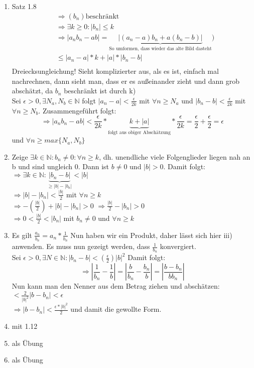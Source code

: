 \documentclass[12pt]{article}
\begin{document}
\begin{enumerate}[\bfseries i)]
	\item Satz 1.8 \begin{align*}
	&\Rightarrow (b_n) \text{beschränkt}\\
	& \Rightarrow \exists k \geq 0: |b_n| \leq k \\ 
	&\Rightarrow |a_n b_n - ab| = \underbrace{|(a_n -a)b_n + a(b_n -b)|}_{\text{So umformen, dass wieder das alte Bild dasteht}})\\
	&\leq |a_n -a|*k + |a| * |b_n -b|\\	 
	\end{align*}
	Dreiecksungleichung! Sieht komplizierter aus, als es ist, einfach mal nachrechnen, dann sieht man, dass er es außeinander zieht und dann grob abschätzt, da $b_n$ beschränkt ist durch k)\\
	Sei $\epsilon > 0, \exists N_a,N_b \in \mathbb{N}$ folgt $|a_n -a| < \frac{\epsilon}{2k}$ mit $\forall n \geq N_a$ und  $|b_n -b| < \frac{\epsilon}{2k}$ mit $\forall n \geq N_b$. Zusammengeführt folgt:
	$$ \Rightarrow |a_n b_n - ab| < \frac{\epsilon}{2k} *\underbrace{k + |a| }_{\text{folgt aus obiger Abschätzung}}* \frac{\epsilon}{2k} = \frac{\epsilon}{2} + \frac{\epsilon}{2} = \epsilon$$ 
	und $\forall n \geq max\{N_a,N_b\}$\\
	\item Zeige $\exists k \in \mathbb{N}: b_n \neq 0 : \forall n \geq k$, dh. unendliche viele Folgenglieder liegen nah an b und sind ungleich 0. Dann ist $b\neq 0$ und $|b| >0$. Damit folgt: \\
	$\Rightarrow \exists k \in \mathbb{N}: \underbrace{|b_n - b|}_{\geq |b| - |b_n|} < |b|$\\
	$\Rightarrow |b|- |b_n| < \frac{|b| }{2}$ mit $\forall n \geq k $\\
	$\Rightarrow -(\frac{|b| }{2}) + |b| - |b_n| > 0 $ $\Rightarrow \frac{|b| }{2} - |b_n| >0$\\
	$\Rightarrow 0 < \frac{|b| }{2} < |b_n|$ mit $b_n \neq 0$ und $\forall n \geq k$ \\
	
	\item Es gilt $\frac{a_n}{b_n} = a_n * \frac{1}{b_n}$ Nun haben wir ein Produkt, daher lässt sich hier iii) anwenden. Es muss nun gezeigt werden, dass $\frac{1}{b_n}$ konvergiert. \\
	Sei $\epsilon>0,\exists N \in \mathbb{N} : |b_n - b| < (\frac{\epsilon}{2}) |b|^2$ Damit folgt:
	$$\Rightarrow |\frac{1}{b_n} - \frac{1}{b}| = | \frac{b}{b_n} -\frac{b_n}{b}| = |\frac{b-b_n}{bb_n}|$$
	Nun kann man den Nenner aus dem Betrag ziehen und abschätzen:\\
	$< \frac{2}{|b|^2} |b-b_n| < \epsilon$ \\
	$ \Rightarrow |b-b_n| < \frac{\epsilon *|b|^2}{2}$ und damit die gewollte Form. \\
	
	\item mit 1.12 \\
	\item als Übung \\
	\item als Übung
\end{enumerate}
\end{document}
